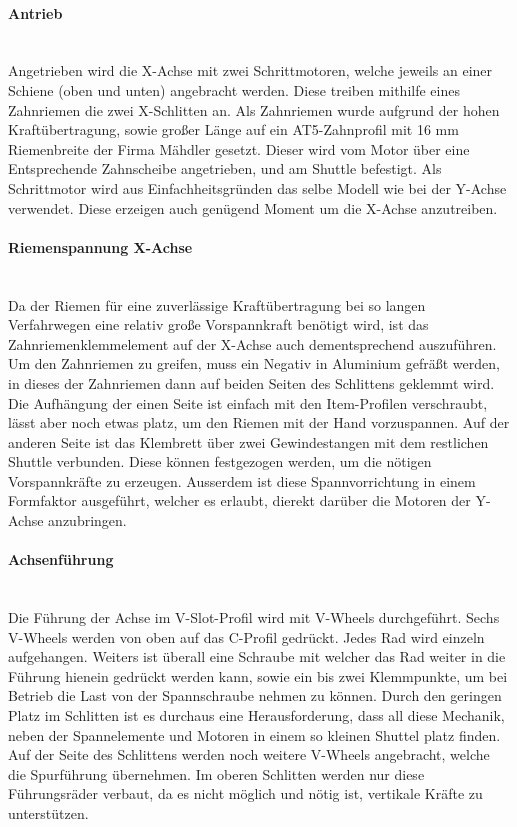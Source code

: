 \paragraph{Antrieb}\mbox{}\\
Angetrieben wird die X-Achse mit zwei Schrittmotoren, welche jeweils an einer Schiene (oben und unten) angebracht werden. Diese treiben mithilfe eines Zahnriemen die zwei X-Schlitten an. Als Zahnriemen wurde aufgrund der hohen Kraftübertragung, sowie großer Länge auf ein AT5-Zahnprofil mit 16 mm Riemenbreite der Firma Mähdler gesetzt. Dieser wird vom Motor über eine Entsprechende Zahnscheibe angetrieben, und am Shuttle befestigt. Als Schrittmotor wird aus Einfachheitsgründen das selbe Modell wie bei der Y-Achse verwendet. Diese erzeigen auch genügend Moment um die X-Achse anzutreiben.

\paragraph{Riemenspannung X-Achse} \mbox{}\\
Da der Riemen für eine zuverlässige Kraftübertragung bei so langen Verfahrwegen eine relativ große Vorspannkraft benötigt wird, ist das Zahnriemenklemmelement auf der X-Achse auch dementsprechend auszuführen. Um den Zahnriemen zu greifen, muss ein Negativ in Aluminium gefräßt werden, in dieses der Zahnriemen dann auf beiden Seiten des Schlittens geklemmt wird. Die Aufhängung der einen Seite ist einfach mit den Item-Profilen verschraubt, lässt aber noch etwas platz, um den Riemen mit der Hand vorzuspannen. Auf der anderen Seite ist das Klembrett über zwei Gewindestangen mit dem restlichen Shuttle verbunden. Diese können festgezogen werden, um die nötigen Vorspannkräfte zu erzeugen. Ausserdem ist diese Spannvorrichtung in einem Formfaktor ausgeführt, welcher es erlaubt, dierekt darüber die Motoren der Y-Achse anzubringen. 

\paragraph{Achsenführung} \mbox{}\\
Die Führung der Achse im V-Slot-Profil wird mit V-Wheels durchgeführt. Sechs V-Wheels werden von oben auf das C-Profil gedrückt. Jedes Rad wird einzeln aufgehangen. Weiters ist überall eine Schraube mit welcher das Rad weiter in die Führung hienein gedrückt werden kann, sowie ein bis zwei Klemmpunkte, um bei Betrieb die Last von der Spannschraube nehmen zu können. Durch den geringen Platz im Schlitten ist es durchaus eine Herausforderung, dass all diese Mechanik, neben der Spannelemente und Motoren in einem so kleinen Shuttel platz finden. Auf der Seite des Schlittens werden noch weitere V-Wheels angebracht, welche die Spurführung übernehmen.
Im oberen Schlitten werden nur diese Führungsräder verbaut, da es nicht möglich und nötig ist, vertikale Kräfte zu unterstützen.

